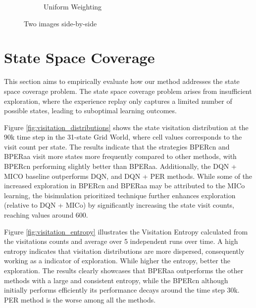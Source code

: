 \begin{figure}[!h]
\begin{subfigure}{0.45\textwidth}
        \caption{Uniform Weighting}
        \label{fig:priority_dist_distance_uniform_weighting}
    \end{subfigure}
    \caption{Two images side-by-side}
    \label{fig:priority_dist_distance}
\end{figure}

\section{State Space Coverage}

This section aims to empirically evaluate how our method addresses the state space coverage problem. The state space coverage problem arises from insufficient exploration, where the experience replay only captures a limited number of possible states, leading to suboptimal learning outcomes.

Figure \ref{fig:visitation_distributions} shows the state visitation distribution at the 90k time step in the 31-state Grid World, where cell values corresponds to the visit count per state. The results indicate that the strategies BPERcn and BPERaa visit more states more frequently compared to other methods, with BPERcn performing slightly better than BPERaa. Additionally, the DQN + MICO baseline outperforms DQN, and DQN + PER methods. While some of the increased exploration in BPERcn and BPERaa may be attributed to the MICo learning, the bisimulation prioritized technique further enhances exploration (relative to DQN + MICo) by significantly increasing the state visit counts, reaching values around 600.

Figure \ref{fig:visitation_entropy} illustrates the Visitation Entropy calculated from the visitations counts and average over 5 independent runs over time. A high entropy indicates that visitation distributions are more dispersed, consequently working as a indicator of exploration. While higher the entropy, better the exploration. The results clearly showcases that BPERaa outperforms the other methods with a large and consistent entropy, while the BPERcn although initially performs efficiently its performance decays around the time step 30k. PER method is the worse among all the methods. 


